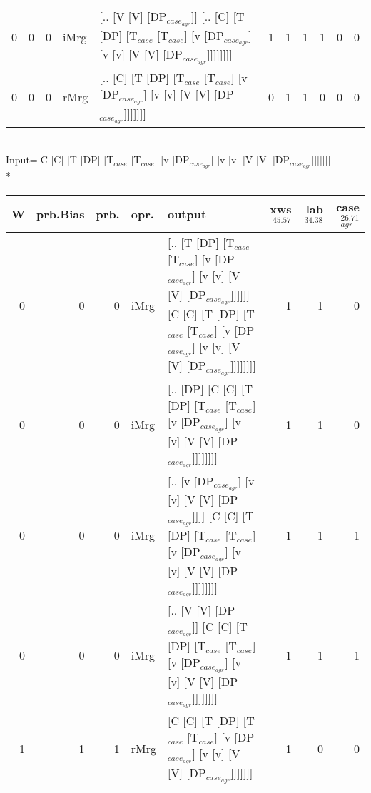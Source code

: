 \begin{tabularx}{\linewidth}{rrrlXrrrrrr}
   0 &       0 &   0 & iMrg & [.. [V [V] [DP$_{case_{agr}}$]] [.. [C] [T [DP] [T$_{case}$ [T$_{case}$] [v [DP$_{case_{agr}}$] [v [v] [V [V] [DP$_{case_{agr}}$]]]]]]]]                                                      &            1 &             1 &             1 &                  1 &              0 &              0 \\
   0 &       0 &   0 & rMrg & [.. [C] [T [DP] [T$_{case}$ [T$_{case}$] [v [DP$_{case_{agr}}$] [v [v] [V [V] [DP$_{case_{agr}}$]]]]]]]                                                                                 &            0 &             1 &             1 &                  0 &              0 &              0 \\
\hline
\end{tabularx}\endgroup\\
\begingroup\scriptsize Input=[C [C] [T [DP] [T$_{case}$ [T$_{case}$] [v [DP$_{case_{agr}}$] [v [v] [V [V] [DP$_{case_{agr}}$]]]]]]]\\*
\begin{tabularx}{\linewidth}{rrrlXrrr}
\hline
   W &   prb.Bias &   prb. & opr.   & output                                                                                                                                                             &   xws$^{45.57}$ &   lab$^{34.38}$ &   case$_{agr}^{26.71}$ \\
\hline
   0 &       0 &   0 & iMrg & [.. [T [DP] [T$_{case}$ [T$_{case}$] [v [DP$_{case_{agr}}$] [v [v] [V [V] [DP$_{case_{agr}}$]]]]]] [C [C] [T [DP] [T$_{case}$ [T$_{case}$] [v [DP$_{case_{agr}}$] [v [v] [V [V] [DP$_{case_{agr}}$]]]]]]]] &             1 &             1 &                  0 \\
   0 &       0 &   0 & iMrg & [.. [DP] [C [C] [T [DP] [T$_{case}$ [T$_{case}$] [v [DP$_{case_{agr}}$] [v [v] [V [V] [DP$_{case_{agr}}$]]]]]]]]                                                                       &             1 &             1 &                  0 \\
   0 &       0 &   0 & iMrg & [.. [v [DP$_{case_{agr}}$] [v [v] [V [V] [DP$_{case_{agr}}$]]]] [C [C] [T [DP] [T$_{case}$ [T$_{case}$] [v [DP$_{case_{agr}}$] [v [v] [V [V] [DP$_{case_{agr}}$]]]]]]]]                            &             1 &             1 &                  1 \\
   0 &       0 &   0 & iMrg & [.. [V [V] [DP$_{case_{agr}}$]] [C [C] [T [DP] [T$_{case}$ [T$_{case}$] [v [DP$_{case_{agr}}$] [v [v] [V [V] [DP$_{case_{agr}}$]]]]]]]]                                                      &             1 &             1 &                  1 \\
   1 &       1 &   1 & rMrg & [C [C] [T [DP] [T$_{case}$ [T$_{case}$] [v [DP$_{case_{agr}}$] [v [v] [V [V] [DP$_{case_{agr}}$]]]]]]]                                                                                 &             1 &             0 &                  0 \\
\hline
\end{tabularx}\endgroup\\
